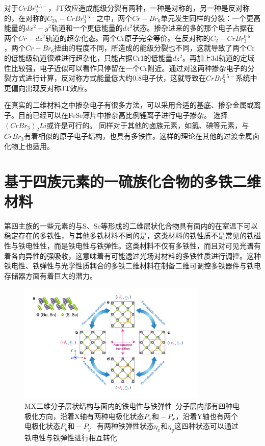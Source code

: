对于$CrBr_{3}^{0.5-}$，JT效应造成能级分裂有两种，一种是对称的，另一种是反对称的，在对称的$C_{2h}-CrBr_{3}^{0.5-}$之中，两个$Cr-Br_{6}$单元发生同样的分裂：一个更高能量的$dx^{2}-y^{2}$轨道和一个更低能量的$dz^{2}$状态。掺杂进来的多的那个电子占据在两个$Cr-dz^{2}$轨道的超杂化态。两个Cr原子完全等价。在反对称的$C_{2}-CrBr_{3}^{0.5-}$，两个$Cr-Br_{6}$扭曲的程度不同，所造成的能级分裂也不同，这就导致了两个Cr的低能级轨道很难进行超杂化，只能占据Cr1的低能量$dz^{2}$。再加上3d轨道的定域性比较强，电子近似可以看作只停留在一个Cr附近。通过对这两种掺杂电子的分裂方式进行计算，反对称方式能量低大约0.8电子伏，这就导致在$CrBr_{3}^{0.5-}$系统中更偏向出现反对称JT效应。

在真实的二维材料之中掺杂电子有很多方法，可以采用合适的基底、掺杂金属或离子。目前已经可以在FeSe薄片中掺杂高比例锂离子进行电子掺杂。\cite{lei2017tuning} 选择$(CrBr_{3})_{2}Li$或许是可行的。 同样对于其他的卤族元素，如氯、碘等元素，与$CrBr_{3}$有着相似的原子电子结构，也具有多铁性。这样的理论在其他的过渡金属卤化物上也适用。

\section{基于四族元素的一硫族化合物的多铁二维材料}

第四主族的一些元素的与S、Se等形成的二维层状化合物具有面内的在室温下可以稳定存在的多铁性，与其他多铁材料不同的是，这类材料的铁性质不是常见的铁磁性与铁电性性，而是铁电性与铁弹性。\cite{wang2017two}\cite{ISI:000088490500004}这类材料不仅有多铁性，而且对可见光谱有着各向异性的强吸收，这意味着有可能透过光场对材料的多铁性质进行调控。这种铁电性、铁弹性与光学性质耦合的多铁二维材料在制备二维可调控多铁器件与铁电存储器方面有着巨大的潜力。
\begin{figure}[h]
    \centering
\includegraphics[width=0.8\textwidth]{./pic/018.png}
\caption{MX二维分子层状结构与面内的铁电性与铁弹性\ 分子层内部有四种电极化方向，沿着X轴有两种电极化状态$P_{x}\text{和}-P_{x}$，沿着Y轴也有两个电极化状态$P_{y}\text{和}-P_{y}$ \ 有两种铁弹性状态$\eta_{x}\text{和}\eta_{y}$这四种状态可以通过铁电性与铁弹性进行相互转化}

\label{dog018}
\end{figure}

